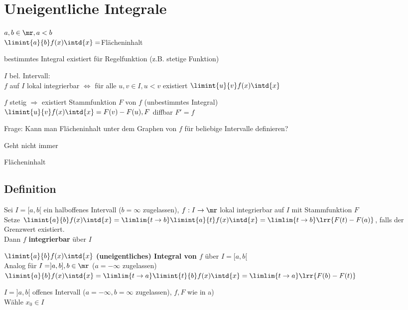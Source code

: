 \newpage
\section{Uneigentliche Integrale}
$a,b\in\mr, a<b$\\
$\limint{a}{b}f(x)\intd{x}=$Flächeninhalt


bestimmtes Integral existiert für Regelfunktion (z.B. stetige Funktion)

$I$ bel. Intervall:\\
$f$ auf $I$ lokal integrierbar $\Leftrightarrow$ für alle $u,v\in I, u<v$ existiert $\limint{u}{v}f(x)\intd{x}$

$f$ stetig $\Rightarrow$ existiert Stammfunktion $F$ von $f$ (unbestimmtes Integral)\\
$\limint{u}{v}f(x)\intd{x}=F(v)-F(u), F$ diffbar $F'=f$

Frage: Kann man Flächeninhalt unter dem Graphen von $f$ für beliebige Intervalle definieren?

Geht nicht immer


 Flächeninhalt

\subsection{Definition}
		\item Sei $I=[a,b[$ ein halboffenes Intervall ($b=\infty$ zugelassen), $f:I\rightarrow\mr$ lokal integrierbar auf $I$ mit Stammfunktion $F$\\
			Setze $\limint{a}{b}f(x)\intd{x}=\limlim{t\rightarrow b}\limint{a}{t}f(x)\intd{x}=\limlim{t\rightarrow b}\lrr{F(t)-F(a)}$, falls der Grenzwert existiert.\\
			Dann $f$ \textbf{integrierbar} über $I$
			
			$\limint{a}{b}f(x)\intd{x}$ \textbf{(uneigentliches) Integral von $f$} über $I=[a,b[$\\
			Analog für $I=]a,b], b\in\mr$ ($a=-\infty$ zugelassen)\\
			$\limint{a}{b}f(x)\intd{x}=\limlim{t\rightarrow a}\limint{t}{b}f(x)\intd{x}=\limlim{t\rightarrow a}\lrr{F(b)-F(t)}$
		\item $I=]a,b[$ offenes Intervall ($a=-\infty, b=\infty$ zugelassen), $f,F$ wie in a)\\
			Wähle $x_0\in I$
			
